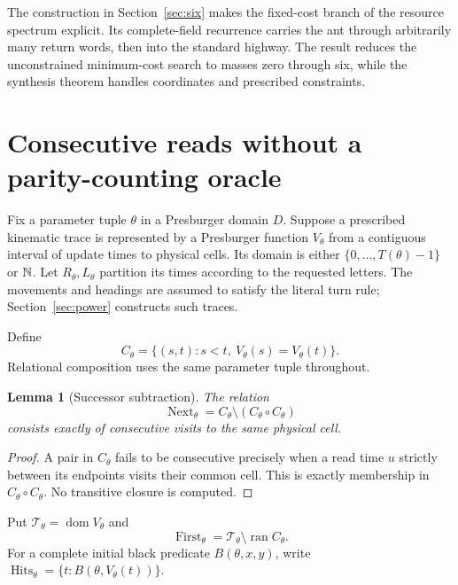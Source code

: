 \documentclass[11pt]{article}
\newtheorem{lemma}[theorem]{Lemma}
\theoremstyle{remark}\newtheorem{remark}[theorem]{Remark}
\newcommand{\dom}{\operatorname{dom}}\newcommand{\ran}{\operatorname{ran}}
\begin{document}
The construction in Section~\ref{sec:six} makes the fixed-cost branch of the
resource spectrum explicit. Its complete-field recurrence carries the ant
through arbitrarily many return words, then into the standard highway. The
result reduces the unconstrained minimum-cost search to masses zero through
six, while the synthesis theorem handles coordinates and prescribed constraints.

\section{Consecutive reads without a parity-counting oracle}
Fix a parameter tuple $\theta$ in a Presburger domain $D$. Suppose a prescribed
kinematic trace is represented by a Presburger function $V_\theta$ from a
contiguous interval of update times to physical cells. Its domain is either
$\{0,\ldots,T(\theta)-1\}$ or $\mathbb N$. Let $R_\theta,L_\theta$ partition its times
according to the requested letters. The movements and headings are assumed to
satisfy the literal turn rule; Section~\ref{sec:power} constructs such traces.

Define
\[
 C_\theta=\{(s,t):s<t,\ V_\theta(s)=V_\theta(t)\}.
\]
Relational composition uses the same parameter tuple throughout.
\begin{lemma}[Successor subtraction]\label{lem:next}
The relation
\begin{equation}\label{eq:next}
 \operatorname{Next}_\theta=C_\theta\setminus(C_\theta\circ C_\theta)
\end{equation}
consists exactly of consecutive visits to the same physical cell.
\end{lemma}
\begin{proof}
A pair in $C_\theta$ fails to be consecutive precisely when a read time $u$
strictly between its endpoints visits their common cell. This is exactly
membership in $C_\theta\circ C_\theta$. No transitive closure is computed.
\end{proof}

Put $\mathcal T_\theta=\dom V_\theta$ and
\[
 \operatorname{First}_\theta=\mathcal T_\theta\setminus\ran C_\theta.
\]
For a complete initial black predicate $B(\theta,x,y)$, write
$\operatorname{Hits}_\theta=\{t:B(\theta,V_\theta(t))\}$.
\end{document}
